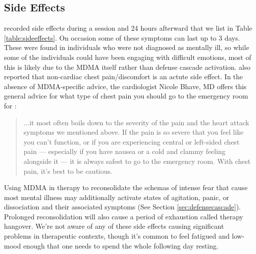 \documentclass[12pt,letterpaper]{book}
\begin{document}
\subsection*{Side Effects}
\textcite{liechtiGender} recorded side effects during a session and 24 hours afterward that we list in Table \ref{table:sideeffects}. On occasion some of these symptoms can last up to 3 days. These were found in individuals who were not diagnosed as mentally ill, so while some of the individuals could have been engaging with difficult emotions, most of this is likely due to the MDMA itself rather than defense cascade activation. \textcite{colcott2024side} also reported that non-cardiac chest pain/discomfort is an actute side effect. In the absence of MDMA-specific advice, the cardiologist Nicole Bhave, MD offers this general advice for what type of chest pain you should go to the emergency room for \cite{chestPain}:
\begin{quotation}
    ...it most often boils down to the severity of the pain and the heart attack symptoms we mentioned above. If the pain is so severe that you feel like you can’t function, or if you are experiencing central or left-sided chest pain — especially if you have nausea or a cold and clammy feeling alongside it — it is always safest to go to the emergency room. With chest pain, it’s best to be cautious.
\end{quotation}
Using MDMA in therapy to reconsolidate the schemas of intense fear that cause most mental illness may additionally activate states of agitation, panic, or dissociation and their associated symptoms (See Section \ref{sec:defensecascade}). Prolonged reconsolidation will also cause a period of exhaustion called therapy hangover. We're not aware of any of these side effects causing significant problems in therapeutic contexts, though it's common to feel fatigued and low-mood enough that one needs to spend the whole following day resting.
\FloatBarrier
\end{document}
